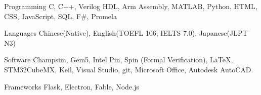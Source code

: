 
\begin{cvskills}
  \cvskill
    {Programming} %
    {C, C++, Verilog HDL, Arm Assembly, MATLAB, Python, HTML, CSS, JavaScript, SQL, F\#, Promela} %
    
  \cvskill
    {Languages}
    {Chinese(Native), English(TOEFL 106, IELTS 7.0), Japanese(JLPT N3)}
    
  \cvskill
    {Software} %
    {Champsim, Gem5, Intel Pin, Spin (Formal Verification), LaTeX, STM32CubeMX, Keil, Visual Studio, git, Microsoft Office,  Autodesk AutoCAD.} %
    
  \cvskill
    {Frameworks} %
    {Flask, Electron, Fable, Node.js} %
    
\end{cvskills}
